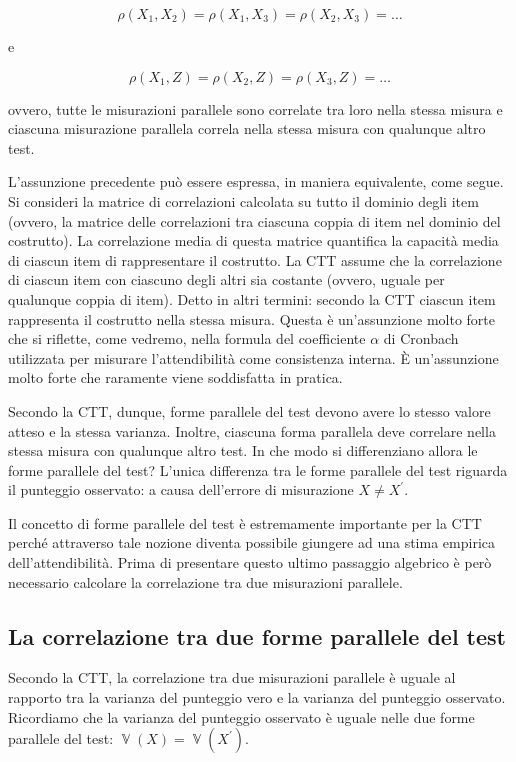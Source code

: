 \documentclass[
  11pt,
]{krantz}
\DeclareMathOperator{\V}{\mathbb{V}} %
\theoremstyle{definition}
\theoremstyle{definition}
\theoremstyle{definition}
\theoremstyle{definition}
\theoremstyle{remark}
\begin{document}
\[
\rho(X_1, X_2) = \rho(X_1, X_3) = \rho(X_2, X_3) = \dots
\]

e

\[
\rho(X_1, Z) = \rho(X_2,Z) = \rho(X_3, Z) = \dots
\]

ovvero, tutte le misurazioni parallele sono correlate tra loro nella stessa misura e ciascuna misurazione parallela correla nella stessa misura con qualunque altro test.

L'assunzione precedente può essere espressa, in maniera equivalente, come segue. Si consideri la matrice di correlazioni calcolata su tutto il dominio degli item (ovvero, la matrice delle correlazioni tra ciascuna coppia di item nel dominio del costrutto). La correlazione media di questa matrice quantifica la capacità media di ciascun item di rappresentare il costrutto. La CTT assume che la correlazione di ciascun item con ciascuno degli altri sia costante (ovvero, uguale per qualunque coppia di item). Detto in altri termini: secondo la CTT ciascun item rappresenta il costrutto nella stessa misura. Questa è un'assunzione molto forte che si riflette, come vedremo, nella formula del coefficiente \(\alpha\) di Cronbach utilizzata per misurare l'attendibilità come consistenza interna. È un'assunzione molto forte che raramente viene soddisfatta in pratica.

Secondo la CTT, dunque, forme parallele del test devono avere lo stesso valore atteso e la stessa varianza. Inoltre, ciascuna forma parallela deve correlare nella stessa misura con qualunque altro test. In che modo si differenziano allora le forme parallele del test? L'unica differenza tra le forme parallele del test riguarda il punteggio osservato: a causa dell'errore di misurazione \(X \neq X^\prime\).

Il concetto di forme parallele del test è estremamente importante per la CTT perché attraverso tale nozione diventa possibile giungere ad una stima empirica dell'attendibilità. Prima di presentare questo ultimo passaggio algebrico è però necessario calcolare la correlazione tra due misurazioni parallele.

\hypertarget{la-correlazione-tra-due-forme-parallele-del-test}{%
\subsection{La correlazione tra due forme parallele del test}\label{la-correlazione-tra-due-forme-parallele-del-test}}

Secondo la CTT, la correlazione tra due misurazioni parallele è uguale al rapporto tra la varianza del punteggio vero e la varianza del punteggio osservato. Ricordiamo che la varianza del punteggio osservato è uguale nelle due forme parallele del test: \(\V(X) = \V(X^\prime)\).
\end{document}

